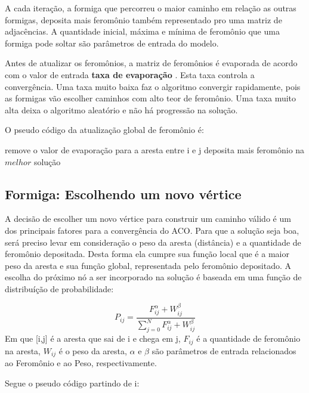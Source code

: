 \documentclass{article}
\begin{document}
A cada iteração, a formiga que percorreu o maior caminho em relação as outras formigas, deposita mais feromônio também representado pro uma matriz de adjacências. A quantidade inicial, máxima e mínima de feromônio que uma formiga pode soltar são parâmetros de entrada do modelo.
\newline
\par
Antes de atualizar os feromônios, a matriz de feromônios é evaporada de acordo com o valor de entrada \textbf{taxa de evaporação} . Esta taxa controla a convergência. Uma taxa muito baixa faz o algoritmo convergir rapidamente, pois as formigas vão escolher caminhos com alto teor de feromônio. Uma taxa muito alta deixa o algoritmo aleatório e não há progressão na solução.
\newline
\par
O pseudo código da atualização global de feromônio é:
\newline
\par
 \begin{algorithmic}
 \STATE remove o valor de evaporação para a aresta entre i e j
 \ENDIF
 \ENDFOR
 \ENDFOR
 \STATE deposita mais feromônio na $melhor$ solução
 \newline
 \end{algorithmic}
\par

\subsection{Formiga: Escolhendo um novo vértice}

 A decisão de escolher um novo vértice para construir um caminho válido é um dos principais fatores para a convergência do ACO. Para que a solução seja boa, será preciso levar em consideração o peso da aresta (distância) e a quantidade de feromônio depositada. Desta forma ela cumpre sua função local que é a maior peso da aresta e sua função global, representada pelo feromônio depositado. A escolha do próximo nó a ser incorporado na solução é baseada em uma função de distribuíção de probabilidade:
\newline
\par
\begin{equation}
P_{ij} = \frac{F_{ij}^{\alpha} + W_{ij}^{\beta}}{\sum_{j=0}^{N}F_{ij}^{\alpha} + W_{ij}^{\beta}}
\end{equation}
\newline
Em que [i,j] é a aresta que sai de i e chega em j, $F_{ij}$ é a quantidade de feromônio na aresta, $W_{ij}$ é o peso da aresta, $\alpha$ e $\beta$ são parâmetros de entrada relacionados ao Feromônio e ao Peso, respectivamente.
\newline
\par
Segue o pseudo código partindo de i:
\newline
\par
\end{document}
